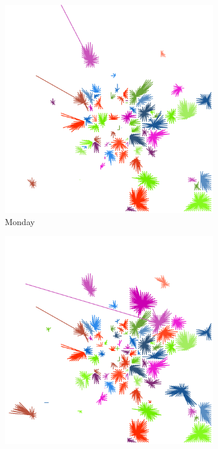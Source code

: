 \documentclass[12pt,a4paper]{article}
\begin{document}
\begin{figure}[H]
\centering
\begin{subfigure}[b]{0.48\textwidth}
\includegraphics[width=\textwidth]{weekDef/edges-1Mon-small.png}
\caption{Monday}
\end{subfigure}
\begin{subfigure}[b]{0.48\textwidth}
\includegraphics[width=\textwidth]{weekDef/edges-2Tue-small.png}

\end{subfigure}
\end{figure}
\end{document}
